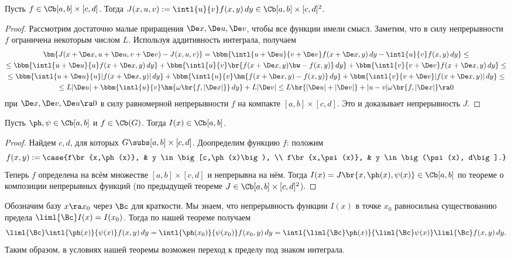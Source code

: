 \documentclass[a4paper]{article}
\newcommand{\dx}{\De x}
\newcommand{\du}{\De u}
\newcommand{\Dv}{\De v}
\begin{document}
\begin{theorem}
Пусть $f \in\Cb[a,b]\times[c,d]$. Тогда $J(x,u,v) := \intl{u}{v}f(x,y)\,d y \in\Cb
[a,b]\times[c,d]^2$.
\end{theorem}
\begin{proof}
Рассмотрим достаточно малые приращения $\dx, \du, \Dv$, чтобы все функции имели смысл. Заметим,
что в силу непрерывности $f$ ограничена некоторым числом $L$. Используя аддитивность интеграла, получаем
\begin{multline*}
\bm{J(x+\dx,u+\du,v+\Dv)-J(x,u,v)}=\bbm{\intl{u+\du}{v+\Dv}f(x+\dx,y)\,d y-\intl{u}{v}f(x,y)\,dy} \le\\
\le\bbm{\intl{u+\du}{u}f(x+\dx,y)\,d y} + \bbm{\intl{u}{v}\br{f(x+\dx,y)\bw-f(x,y)}\,d y} +
\bbm{\intl{v}{v+\Dv}f(x+\dx,y)\,d y} \le\\\le
\bbm{\intl{u+\du}{u}|f(x+\dx,y)|\,d y} +
\bbm{\intl{u}{v}\hm{f(x+\dx,y)-f(x,y)}\,d y} + \bbm{\intl{v}{v+\Dv}|f(x+\dx,y)|\,d y} \le\\\le L|\du|
+ \bbm{\intl{u}{v}\hm{\omega\br{f, |\dx|}}\,d y} + L|\Dv| \le L\br{|\du| + |\Dv|} +
|u-v|\omega\br{f,|\dx|} \ra 0
\end{multline*}
при $\dx, \Dv, \du \ra 0$ в силу равномерной непрерывности $f$ на
компакте $[a,b]\times[c,d]$. Это и доказывает непрерывность $J$.
\end{proof}

\begin{theorem}
Пусть $\ph, \psi \in\Cb[a,b]$ и $f \in\Cb(G)$. Тогда $I(x) \in\Cb[a,b]$.
\end{theorem}
\begin{proof}
Найдем $c,d$, для которых $G \subs [a,b]\times[c,d]$. Доопределим функцию $f$: положим
$$f(x,y) := \case{f\br{x,\ph(x)}, & y \in \big[c,\ph(x)\big), \\ f\br{x,\psi(x)}, & y \in \big(\psi(x), d\big].}$$
Теперь $f$ определена на всём множестве $[a,b]\times[c,d]$ и непрерывна на нём. Тогда
$I(x) = J\br{x,\ph(x),\psi(x)} \in\Cb[a,b]$ по теореме о композиции
непрерывных функций (по предыдущей теореме $J \in\Cb[a,b]\times[c,d]^2$).
\end{proof}

Обозначим базу $x \ra x_0$ через $\Bc$ для краткости. Мы знаем, что непрерывность
функции $I(x)$ в точке $x_0$ равносильна существованию предела
$\liml{\Bc} I(x) = I(x_0)$. Тогда по нашей теореме получаем
$$\liml{\Bc} \intl{\ph(x)}{\psi(x)}f(x,y)\,d y=\intl{\ph(x_0)}{\psi(x_0)}f(x_0,y)\,d y
=\intl{\liml{\Bc}\ph(x)}{\liml{\Bc}\psi(x)}\liml{\Bc}f(x,y)\,d y.$$ Таким образом, в условиях
нашей теоремы возможен переход к пределу под знаком интеграла.
\end{document}
